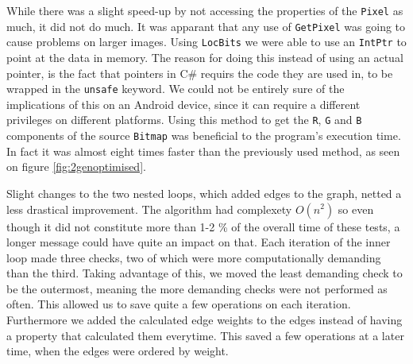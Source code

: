 While there was a slight speed-up by not accessing the properties of the \lstinline|Pixel| as much, it did not do much.
It was apparant that any use of \lstinline|GetPixel| was going to cause problems on larger images.
Using \lstinline|LocBits| we were able to use an \lstinline|IntPtr| to point at the data in memory.\citep{MSDNIntPtr}
The reason for doing this instead of using an actual pointer, is the fact that pointers in C\# requirs the code they are used in, to be wrapped in the \lstinline|unsafe| keyword. 
We could not be entirely sure of the implications of this on an Android device, since it can require a different privileges on different platforms.
Using this method to get the \lstinline|R|, \lstinline|G| and \lstinline|B| components of the source \lstinline|Bitmap| was beneficial to the program's execution time.
In fact it was almost eight times faster than the previously used method, as seen on figure \ref{fig:2genoptimised}.

Slight changes to the two nested loops, which added edges to the graph, netted a less drastical improvement.
The algorithm had complexety $O(n^2)$ so even though it did not constitute more than 1-2 \% of the overall time of these tests, a longer message could have quite an impact on that.
Each iteration of the inner loop made three checks, two of which were more computationally demanding than the third.
Taking advantage of this, we moved the least demanding check to be the outermost, meaning the more demanding checks were not performed as often.
This allowed us to save quite a few operations on each iteration. 
Furthermore we added the calculated edge weights to the edges instead of having a property that calculated them everytime. 
This saved a few operations at a later time, when the edges were ordered by weight.

